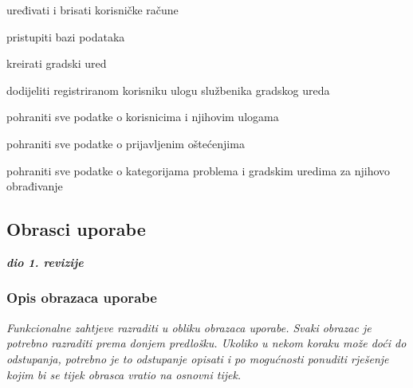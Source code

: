 \begin{packed_enum}
	\begin{packed_enum}

		\item uređivati i brisati korisničke račune
		\item pristupiti bazi podataka
		\item kreirati gradski ured
		\item dodijeliti registriranom korisniku ulogu službenika gradskog ureda

	\end{packed_enum}

	\item {}

	\begin{packed_enum}

		\item pohraniti sve podatke o korisnicima i njihovim ulogama
		\item pohraniti sve podatke o prijavljenim oštećenjima
		\item pohraniti sve podatke o kategorijama problema i gradskim uredima za njihovo obrađivanje

	\end{packed_enum}

\end{packed_enum}


\eject



\subsection{Obrasci uporabe}

\textbf{\textit{dio 1. revizije}}

\subsubsection{Opis obrazaca uporabe}
\textit{Funkcionalne zahtjeve razraditi u obliku obrazaca uporabe. Svaki obrazac je potrebno razraditi prema donjem predlošku. Ukoliko u nekom koraku može doći do odstupanja, potrebno je to odstupanje opisati i po mogućnosti ponuditi rješenje kojim bi se tijek obrasca vratio na osnovni tijek.}\\



